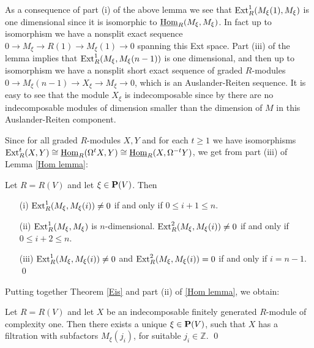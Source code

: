 \documentclass[10pt]{amsart}
\begin{document}
\noindent As a consequence of part (i) of the above lemma we see that 
$\operatorname{Ext}\nolimits^1_R(M_{\xi}(1),M_{\xi})$ is one dimensional since it is isomorphic 
to $\underline{\operatorname{Hom}}_R(M_{\xi},M_{\xi})$. In fact up to isomorphism we have
a nonsplit exact sequence $0\rightarrow M_{\xi}\rightarrow R(1)\rightarrow M_{\xi}(1)\rightarrow 0$ 
spanning this Ext space. Part (iii) of the lemma implies that $\operatorname{Ext}\nolimits_R^1(M_{\xi},M_{\xi}(n-1))$ 
is one dimensional, and then up to isomorphism we have a nonsplit short exact sequence 
of graded $R$-modules $0\rightarrow M_{\xi}(n-1)\rightarrow X_{\xi}\rightarrow M_{\xi}\rightarrow 0$, which is an Auslander-Reiten sequence.  
It is easy to see that the module $X_{\xi}$ is indecomposable since by \cite{E} there are no indecomposable modules of dimension smaller than the dimension of $M$ in this Auslander-Reiten component.

\medskip
\noindent Since for all graded $R$-modules $X,Y$ and for each $t\ge 1$ we have isomorphisms 
$\operatorname{Ext}\nolimits^t_R(X,Y) \cong \underline{\operatorname{Hom}}_R(\Omega^tX,Y) \cong \underline{\operatorname{Hom}}_R(X,\Omega^{-t}Y)$,
we get from part (iii) of Lemma \ref{Hom lemma}:
%
\begin{cor}\label{Ext cor} Let $R= R(V)$ and let $\xi \in {\bf P}(V)$. Then
\begin{enumerate}
\item[(i)] $\operatorname{Ext}\nolimits^1_R(M_\xi,M_\xi(i))\ne 0$  if and only if $0\le i+1\le n$. 
\item[(ii)] $\operatorname{Ext}\nolimits^1_R(M_{\xi},M_{\xi})$ is $n$-dimensional. 
$\operatorname{Ext}\nolimits^2_R(M_\xi,M_\xi(i))\ne 0$  if and only if $0\le i+2\le n$.
\item[(iii)] $\operatorname{Ext}\nolimits^1_R(M_\xi,M_\xi(i))\ne 0$ and $\operatorname{Ext}\nolimits^2_R(M_\xi,M_\xi(i))=0$ if and only if $i=n-1$. \qed
\end{enumerate} 
\end{cor}

\medskip
\noindent   Putting together Theorem \ref{Eis} and part (ii) of \ref{Hom lemma}, we obtain:
%
\begin{cor} \label{oneM} Let $R = R(V)$ and let $X$ be an indecomposable finitely generated $R$-module of 
complexity one. Then there exists a unique $\xi \in {\bf P}(V)$, such that $X$ has a filtration
with subfactors $M_{\xi}(j_i)$, for suitable  $j_i\in \mathbb Z$. \qed
\end{cor}
\end{document}
